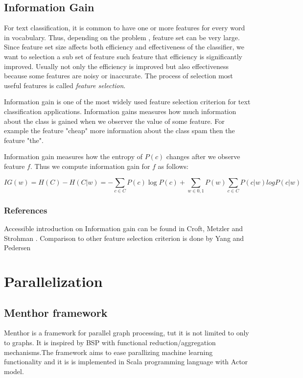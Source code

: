 \documentclass{report}
\begin{document}
\section{Information Gain}
\label{featureselection}

For text classification, it is common to have one or more features for every word in vocabulary. Thus, depending on the problem , feature set can be very large. Since feature set size affects both efficiency and effectiveness of the classifier, we want to selection a sub set of feature such feature that efficiency is significantly improved. Usually not only the efficiency is improved but also effectiveness because some features are noisy or inaccurate. The process of selection most useful features is called \textit{feature selection}.

Information gain is one of the most widely used feature selection criterion for text classification applications. Information gains measures how much information about the class is gained when we observer the value of some feature. For example the feature "cheap" more information about the class spam then the feature "the". 

Information gain measures how the entropy of $P(c)$ changes after we observe feature $f$. Thus we compute information gain for $f$ as follows:

\[
IG(w) = H(C) - H(C|w) = - \sum_{c \in C} P(c) \log P(c) + \sum_{w \in {0,1}} P(w) \sum_{c \in C} P(c|w) log P(c|w)
\]

\subsection{References}

Accessible introduction on Information gain can be found in Croft, Metzler and Strohman \cite{Croft:2010:SEI}. Comparison to other feature selection criterion is done by  Yang and Pedersen  \cite{yang97}

\chapter{Parallelization}

\section{Menthor framework}

Menthor is a framework for parallel graph processing, tut it is not limited to only to graphs. It is inspired by BSP with functional reduction/aggregation mechanisms.The  framework aims to ease parallizing machine learning functionality and it is is implemented in Scala programming language with Actor model.
\end{document}
